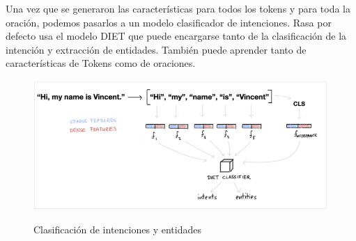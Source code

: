 Una vez que se generaron las características para todos los tokens y para toda la oración, podemos
pasarlos a un
modelo clasificador de intenciones. Rasa por defecto usa el modelo DIET que puede encargarse tanto
de
la clasificación de la intención y extracción de entidades. También puede aprender tanto de
características de Tokens como de oraciones. \cite{warmerdam_2022}
\begin{table}[]

	\caption{Clasificadores de intenciones. Elaboracion propia}
	\label{IntentClassifier}
\end{table}
\begin{figure}[h]
	\centering
	\includegraphics[width=\textwidth]{imagenes/cap3/intent_classiffier.png}
	\caption{Clasificación de intenciones y entidades}
	\label{fig:intentclasification-MLU}
	\cite{Rasa}
\end{figure}

